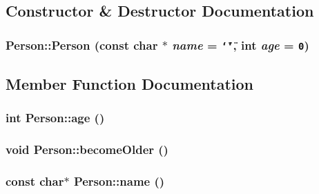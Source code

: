 \subsection{Constructor \& Destructor Documentation}
\hypertarget{classPerson_45a51641d7fe85caee24d024f3f3df29}{
\subsubsection[{Person}]{\setlength{\rightskip}{0pt plus 5cm}Person::Person (const char $\ast$ {\em name} = {\tt \char`\"{}\char`\"{}}, \/  int {\em age} = {\tt 0})}}
\label{classPerson_45a51641d7fe85caee24d024f3f3df29}




\subsection{Member Function Documentation}
\hypertarget{classPerson_0551c356924e036e4cf9f51626d8cbd5}{
\subsubsection[{age}]{\setlength{\rightskip}{0pt plus 5cm}int Person::age ()}}
\label{classPerson_0551c356924e036e4cf9f51626d8cbd5}


\hypertarget{classPerson_70130f5fc7ae5d0386f138d6f37443de}{
\subsubsection[{becomeOlder}]{\setlength{\rightskip}{0pt plus 5cm}void Person::becomeOlder ()}}
\label{classPerson_70130f5fc7ae5d0386f138d6f37443de}


\hypertarget{classPerson_edf33c236854f05b4f44647b8d675c54}{
\subsubsection[{name}]{\setlength{\rightskip}{0pt plus 5cm}const char$\ast$ Person::name ()}}
\label{classPerson_edf33c236854f05b4f44647b8d675c54}


